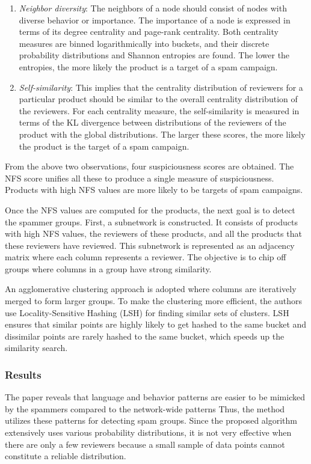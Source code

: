 \documentclass[11pt, oneside]{article}   	%
\begin{document}
\begin{enumerate}
\item \emph{Neighbor diversity}: The neighbors of a node should consist of nodes with diverse behavior or importance.
The importance of a node is expressed in terms of its degree centrality and page-rank centrality.
Both centrality measures are binned logarithmically into buckets, and their discrete probability distributions and Shannon entropies are found.
The lower the entropies, the more likely the product is a target of a spam campaign.
\item \emph{Self-similarity}: This implies that the centrality distribution of reviewers for a particular product should be similar to the overall centrality distribution of the reviewers.
For each centrality measure, the self-similarity is measured in terms of the KL divergence between distributions of the reviewers of the product with the global distributions.
The larger these scores, the more likely the product is the target of a spam campaign.
\end{enumerate}

\quad From the above two observations, four suspiciousness scores are obtained.
The NFS score unifies all these to produce a single measure of suspiciousness.
Products with high NFS values are more likely to be targets of spam campaigns.

\quad Once the NFS values are computed for the products, the next goal is to detect the spammer groups.
First, a subnetwork is constructed.
It consists of products with high NFS values, the reviewers of these products, and all the products that these reviewers have reviewed.
This subnetwork is represented as an adjacency matrix where each column represents a reviewer.
The objective is to chip off groups where columns in a group have strong similarity.

\quad An agglomerative clustering approach is adopted where columns are iteratively merged to form larger groups.
To make the clustering more efficient, the authors use Locality-Sensitive Hashing (LSH) for finding similar sets of clusters.
LSH ensures that similar points are highly likely to get hashed to the same bucket and dissimilar points are rarely hashed to the same bucket, which speeds up the similarity search.

\subsubsection*{Results}

\quad The paper reveals that language and behavior patterns are easier to be mimicked by the spammers compared to the network-wide patterns
Thus, the method utilizes these patterns for detecting spam groups.
Since the proposed algorithm extensively uses various probability distributions, it is not very effective when there are only a few reviewers because a small sample of data points cannot constitute a reliable distribution.
\end{document}
